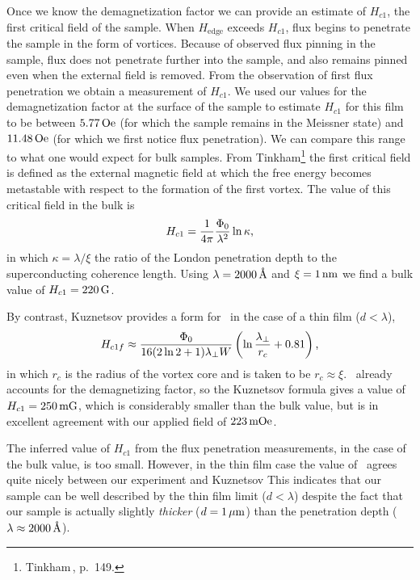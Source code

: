 Once we know the demagnetization factor we can provide an estimate of
$H_{c1}$, the first critical field of the sample. 
When $H_{\mathrm{edge}}$ exceeds 
$H_{c1}$, flux begins to penetrate the sample in the form 
of vortices. Because of observed flux pinning in the sample, flux does 
not penetrate further into the sample, and also remains
pinned even when the external field is removed. From the
observation of first flux penetration we obtain a measurement
of $H_{c1}$.
We used our values for the demagnetization factor at the surface
of the sample to estimate $H_{c1}$ for this film to be between
$5.77\,\mathrm{Oe}$ (for which the sample remains in the Meissner state) 
and $11.48\,\mathrm{Oe}$ (for which we first notice flux penetration).
We can compare this range to what one would expect for bulk samples. 
From Tinkham\footnote{Tinkham\,\cite{tinkham}, p.~149.}
the first critical field is defined as the external magnetic field
at which the free energy becomes metastable with respect to the formation
of the first vortex. The value of this critical field in the bulk
is
%
\begin{equation}
H_{c1} = {1 \over 4\pi} {\Phi_0 \over \lambda^2} \ln\kappa\mbox{,}
\end{equation}
%
in which $\kappa=\lambda/\xi$ the ratio of the London penetration
depth to the superconducting coherence length. 
Using $\lambda = 2000\,\mbox{\AA}$ and $\xi= 1 \,\mathrm{nm}$ we find a bulk 
value of $H_{c1} = 220\,\mathrm{G}$. 

By contrast, Kuznetsov\cite{kuznetsov_prb_59_1507_1999} provides a 
form for \hcone\ in the case of a thin film ($d < \lambda$),
%
\begin{equation}
H_{c1f} \approx {\ensuremath{\Phi_0}\over 16 (2 \ln 2 +1) \lambda_\perp W}
    \left( \ln{\lambda_\perp\over r_c} + 0.81 \right)\mbox{,}
\label{eqn:kuzn_hc1}
\end{equation}
%
in which $r_c$ is the radius of the vortex core and is taken to be
$r_c \approx \xi$. \ already accounts for the 
demagnetizing factor, so 
the Kuznetsov formula 
gives a value of $H_{c1} = 250 \,\mathrm{mG}$, which is considerably smaller
than the bulk value, but is in excellent agreement with our applied field
of $223\,\mathrm{mOe}$.

The inferred value of $H_{c1}$ from the flux penetration measurements,
in the case of the bulk value, is too small. However, in the thin film case
the value of \hcone\ agrees quite nicely between our experiment and
Kuznetsov \etal\cite{kuznetsov_prb_59_1507_1999} This indicates that
our sample can be well described by the thin film limit ($d<\lambda$) 
despite the fact that our sample is actually slightly \emph{thicker}
($d=1\,\mu\mathrm{m}$)
than the penetration depth ($\lambda\approx 2000\,\mbox{\AA}$).

